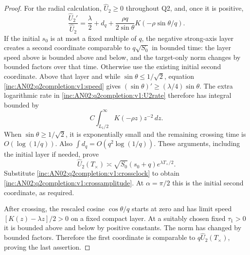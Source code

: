 \documentclass[11pt]{article}
\theoremstyle{remark}\newtheorem{remark}[theorem]{Remark}
\newcommand{\dd}{\,d}\newcommand{\E}{\mathbb E}
\begin{document}
\begin{proof}
For the radial calculation, $\widehat U_2\ge0$ throughout Q2, and, once it is positive,
\begin{equation}\label{inc:AN02:q2completion:v1:U2rate}
 \frac{\widehat U_2'}{\widehat U_2}
 =\frac\lambda2+d_q+\frac{\rho q}{2\sin\theta}
                       K(-\rho\sin\theta/q).
\end{equation}
If the initial $s_0$ is at most a fixed multiple of $q$, the negative strong-axis layer creates a second coordinate comparable to $q\sqrt{S_0}$ in bounded time: the layer speed above is bounded above and below, and the target-only norm changes by bounded factors over that time. Otherwise use the existing initial second coordinate. Above that layer and while $\sin\theta\le1/\sqrt2$, equation \eqref{inc:AN02:q2completion:v1:speed} gives $(\sin\theta)'\ge (\lambda/4)\sin\theta$. The extra logarithmic rate in \eqref{inc:AN02:q2completion:v1:U2rate} therefore has integral bounded by
\[
 C\int_{L_1/2}^{\infty}K(-\rho z)z^{-2}\dd z.
\]
When $\sin\theta\ge1/\sqrt2$, it is exponentially small and the remaining crossing time is $O(\log(1/q))$. Also $\int d_q=O(q^2\log(1/q))$. These arguments, including the initial layer if needed, prove
\[
 \widehat U_2(T_\times)\asymp
 \sqrt{S_0}(s_0+q)e^{\lambda T_\times/2}.
\]
Substitute \eqref{inc:AN02:q2completion:v1:crossclock} to obtain \eqref{inc:AN02:q2completion:v1:crossamplitude}. At $\alpha=\pi/2$ this is the initial second coordinate, as required.

After crossing, the rescaled cosine $\cos\theta/q$ starts at zero and has limit speed $[K(z)-\lambda z]/2>0$ on a fixed compact layer. At a suitably chosen fixed $\tau_1>0$ it is bounded above and below by positive constants. The norm has changed by bounded factors. Therefore the first coordinate is comparable to $q\widehat U_2(T_\times)$, proving the last assertion.
\end{proof}
\end{document}
